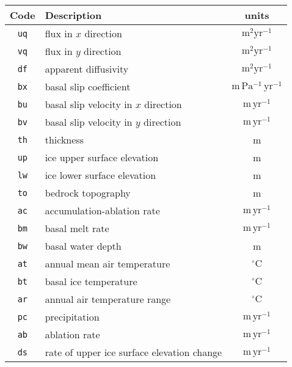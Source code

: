 \begin{center}
\begin{tabular}{|c|l|c|}
\hline
Code & Description & units \\
\hline
\hline
\texttt{uq} & flux in $x$ direction & $\mathrm{m}^2\mathrm{yr}^{-1}$ \\
\texttt{vq} & flux in $y$ direction & $\mathrm{m}^2\mathrm{yr}^{-1}$ \\
\texttt{df} & apparent diffusivity & $\mathrm{m}^2\mathrm{yr}^{-1}$ \\
\texttt{bx} & basal slip coefficient & $\mathrm{m\,Pa^{-1}\,yr^{-1}}$ \\
\texttt{bu} & basal slip velocity in $x$ direction & $\mathrm{m\,yr^{-1}}$\\
\texttt{bv} & basal slip velocity in $y$ direction & $\mathrm{m\,yr^{-1}}$\\
\texttt{th} & thickness & m \\
\texttt{up} & ice upper surface elevation & m \\
\texttt{lw} & ice lower surface elevation & m \\
\texttt{to} & bedrock topography & m \\
\texttt{ac} & accumulation-ablation rate & $\mathrm{m\,yr^{-1}}$ \\
\texttt{bm} & basal melt rate & $\mathrm{m\,yr^{-1}}$ \\
\texttt{bw} & basal water depth & m \\
\texttt{at} & annual mean air temperature & $^{\circ}\mathrm{C}$ \\
\texttt{bt} & basal ice temperature & $^{\circ}\mathrm{C}$ \\
\texttt{ar} & annual air temperature range & $^{\circ}\mathrm{C}$ \\
\texttt{pc} & precipitation & $\mathrm{m\,yr^{-1}}$ \\
\texttt{ab} & ablation rate & $\mathrm{m\,yr^{-1}}$ \\
\texttt{ds} & rate of upper ice surface elevation change &
$\mathrm{m\,yr^{-1}}$ \\
\hline
\end{tabular}
\end{center}
%
